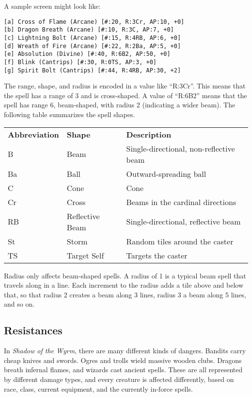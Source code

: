 A sample screen might look like:

\begin{verbatim}
[a] Cross of Flame (Arcane) [#:20, R:3Cr, AP:10, +0]
[b] Dragon Breath (Arcane) [#:10, R:3C, AP:7, +0]
[c] Lightning Bolt (Arcane) [#:15, R:4RB, AP:6, +0]
[d] Wreath of Fire (Arcane) [#:22, R:2Ba, AP:5, +0]
[e] Absolution (Divine) [#:40, R:6B2, AP:50, +0]
[f] Blink (Cantrips) [#:30, R:0TS, AP:3, +0]
[g] Spirit Bolt (Cantrips) [#:44, R:4RB, AP:30, +2]
\end{verbatim}

The range, shape, and radius is encoded in a value like ``R:3Cr''.  This
means that the spell has a range of 3 and is cross-shaped.  A value of
``R:6B2'' means that the spell has range 6, beam-shaped, with radius 2
(indicating a wider beam).  The following table summarizes the spell
shapes.

\begin{table}[h]
\begin{tabular}{lll}
{\bf Abbreviation} & {\bf Shape} & {\bf Description} \\
B & Beam & Single-directional, non-reflective beam \\
Ba & Ball & Outward-spreading ball \\
C & Cone & Cone \\
Cr & Cross & Beams in the cardinal directions \\
RB & Reflective Beam & Single-directional, reflective beam \\
St & Storm & Random tiles around the caster \\
TS & Target Self & Targets the caster \\
\end{tabular}
\end{table}

Radius only affects beam-shaped spells.  A radius of 1 is a typical
beam spell that travels along in a line.  Each increment to the radius
adds a tile above and below that, so that radius 2 creates a beam along
3 lines, radius 3 a beam along 5 lines, and so on.

\subsection{Resistances}

In {\it Shadow of the Wyrm}, there are many different kinds of dangers.  
Bandits carry cheap knives and swords.  Ogres and trolls wield massive
wooden clubs.  Dragons breath infernal flames, and wizards cast ancient 
spells.  These are all represented by different damage types, and every 
creature is affected differently, based on race, class, current equipment, 
and the currently in-force spells.

